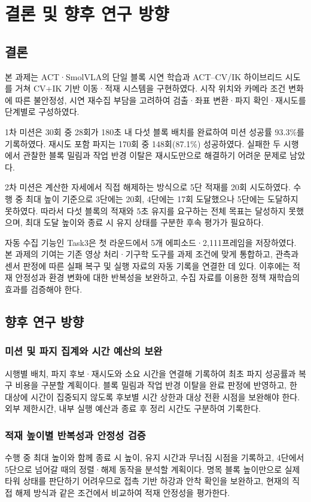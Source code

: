 \chapter{결론 및 향후 연구 방향}
\section{결론}
본 과제는 ACT·SmolVLA의 단일 블록 시연 학습과 ACT--CV/IK 하이브리드 시도를 거쳐 CV+IK 기반 이동·적재 시스템을 구현하였다. 시작 위치와 카메라 조건 변화에 따른 불안정성, 시연 재수집 부담을 고려하여 검출·좌표 변환·파지 확인·재시도를 단계별로 구성하였다.

1차 미션은 30회 중 28회가 180초 내 다섯 블록 배치를 완료하여 미션 성공률 93.3\%를 기록하였다. 재시도 포함 파지는 170회 중 148회(87.1\%) 성공하였다. 실패한 두 시행에서 관찰한 블록 밀림과 작업 반경 이탈은 재시도만으로 해결하기 어려운 문제로 남았다.

2차 미션은 계산한 자세에서 직접 해제하는 방식으로 5단 적재를 20회 시도하였다. 수행 중 최대 높이 기준으로 3단에는 20회, 4단에는 17회 도달했으나 5단에는 도달하지 못하였다. 따라서 다섯 블록의 적재와 5초 유지를 요구하는 전체 목표는 달성하지 못했으며, 최대 도달 높이와 종료 시 유지 상태를 구분한 후속 평가가 필요하다.

자동 수집 기능인 Task3은 첫 라운드에서 5개 에피소드·2{,}111프레임을 저장하였다. 본 과제의 기여는 기존 영상 처리·기구학 도구를 과제 조건에 맞게 통합하고, 관측과 센서 판정에 따른 실패 복구 및 실행 자료의 자동 기록을 연결한 데 있다. 이후에는 적재 안정성과 환경 변화에 대한 반복성을 보완하고, 수집 자료를 이용한 정책 재학습의 효과를 검증해야 한다.

\section{향후 연구 방향}
\subsection{미션 및 파지 집계와 시간 예산의 보완}
시행별 배치, 파지 후보·재시도와 소요 시간을 연결해 기록하여 최초 파지 성공률과 복구 비용을 구분할 계획이다. 블록 밀림과 작업 반경 이탈을 완료 판정에 반영하고, 한 대상에 시간이 집중되지 않도록 후보별 시간 상한과 대상 전환 시점을 보완해야 한다. 외부 제한시간, 내부 실행 예산과 종료 후 정리 시간도 구분하여 기록한다.

\subsection{적재 높이별 반복성과 안정성 검증}
\label{sec:stack-extension}
수행 중 최대 높이와 함께 종료 시 높이, 유지 시간과 무너짐 시점을 기록하고, 4단에서 5단으로 넘어갈 때의 정렬·해제 동작을 분석할 계획이다. 명목 블록 높이만으로 실제 타워 상태를 판단하기 어려우므로 접촉 기반 하강과 안착 확인을 보완하고, 현재의 직접 해제 방식과 같은 조건에서 비교하여 적재 안정성을 평가한다.

